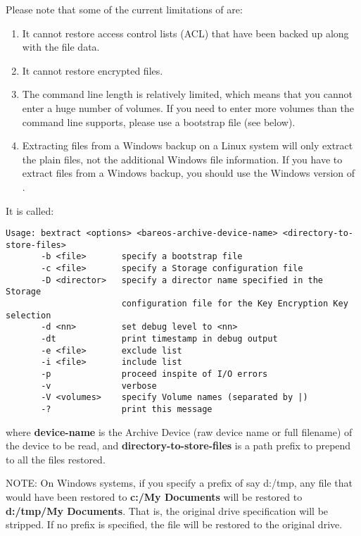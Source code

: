 Please note that some of the current limitations of  are:

\begin{enumerate}
\item It cannot restore access control lists (ACL) that have been
      backed up along with the file data.
\item It cannot restore encrypted files.
\item The command line length is relatively limited,
      which means that you cannot enter a huge number of volumes.  If you need to
      enter more volumes than the command line supports, please use a bootstrap
      file (see below).
\item Extracting files from a Windows backup on a Linux system
      will only extract the plain files, not the additional Windows file information.
      If you have to extract files from a Windows backup,
      you should use the Windows version of .
\end{enumerate}


It is called:

\footnotesize
\begin{verbatim}
Usage: bextract <options> <bareos-archive-device-name> <directory-to-store-files>
       -b <file>       specify a bootstrap file
       -c <file>       specify a Storage configuration file
       -D <director>   specify a director name specified in the Storage
                       configuration file for the Key Encryption Key selection
       -d <nn>         set debug level to <nn>
       -dt             print timestamp in debug output
       -e <file>       exclude list
       -i <file>       include list
       -p              proceed inspite of I/O errors
       -v              verbose
       -V <volumes>    specify Volume names (separated by |)
       -?              print this message
\end{verbatim}
\normalsize

where {\bf device-name} is the Archive Device (raw device name or full
filename) of the device to be read, and {\bf directory-to-store-files} is a
path prefix to prepend to all the files restored.

NOTE: On Windows systems, if you specify a prefix of say d:/tmp, any file that
would have been restored to {\bf c:/My Documents} will be restored to {\bf
d:/tmp/My Documents}. That is, the original drive specification will be
stripped. If no prefix is specified, the file will be restored to the original
drive.

